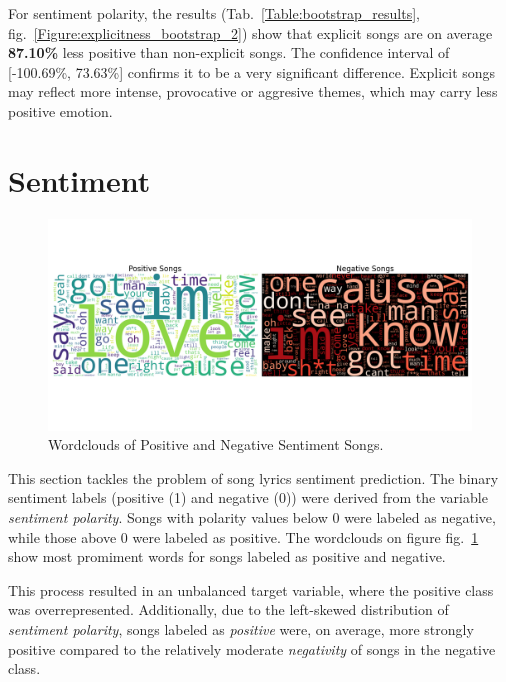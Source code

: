 For sentiment polarity, the results (Tab.~\ref{Table:bootstrap_results},
fig.~\ref{Figure:explicitness_bootstrap_2}) show that explicit songs are on average
\textbf{87.10\%} less positive than non-explicit songs. The confidence interval
of [-100.69\%, 73.63\%] confirms it to be a very significant difference.
Explicit songs may reflect more intense, provocative or aggresive themes, which
may carry less positive emotion.


\section{Sentiment}
\label{sec:sentiment}
\begin{center}
\begin{figure}[H]
  \centering
  \includegraphics[width=7in]{img/wordclouds.png}
  \caption{Wordclouds of Positive and Negative Sentiment Songs.}
  \label{Figure:wordclouds}
\end{figure}
\end{center}

This section tackles the problem of song lyrics sentiment prediction. The
binary sentiment labels (positive (1) and negative (0)) were derived from the
variable \textit{sentiment polarity}. Songs with polarity values below 0 were
labeled as negative, while those above 0 were labeled as positive. The wordclouds
on figure fig.~\ref{Figure:wordclouds} show most promiment words for 
songs labeled as positive and negative.


This process resulted in an unbalanced target variable, where the positive
class was overrepresented. Additionally, due to the left-skewed distribution of
\textit{sentiment polarity}, songs labeled as \textit{positive} were, on
average, more strongly positive compared to the relatively moderate
\textit{negativity} of songs in the negative class. 

